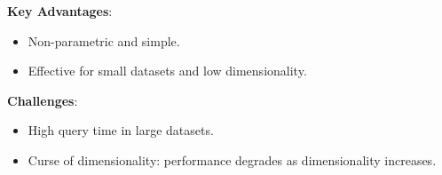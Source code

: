 \documentclass[10pt,landscape]{article}
\begin{document}
\begin{multicols*}{3}
    \textbf{Key Advantages}:
    \begin{itemize}[label=\textbullet]
        \item Non-parametric and simple.
        \item Effective for small datasets and low dimensionality.
    \end{itemize}

    \textbf{Challenges}:
    \begin{itemize}[label=\textbullet]
        \item High query time in large datasets.
        \item Curse of dimensionality: performance degrades as dimensionality increases.
    \end{itemize}




\end{multicols*}
\end{document}
